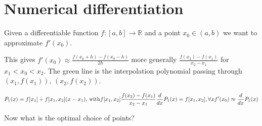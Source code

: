 \chapter{Numerical differentiation}

Given a differentiable function $f : [a, b] \rightarrow \mathbb{R}$ and a point
$x_0 \in (a, b)$ we want to approximate $f'(x_0)$.
  

This gives $f'(x_0) \approx \frac{f(x_0 + h) - f(x_0 - h)}{2h}$ more generally
$\frac{f(x_2) - f(x_1)}{x_2 - x_1}$ for $x_1 < x_0 < x_2$.
The green line is the interpolation polynomial passing through 
$(x_1, f(x_1))$, $(x_2, f(x_2))$.

\[
	P_1(x) = f[x_1] + f[x_1, x_2](x - x_1) \text{, with} f[x_1, x_2] 
	\frac{f(x_2) - f(x_1)}{x_2 - x_1} \\
	\frac{d}{dx} P_1(x) = f[x_1, x_2], \forall x \\
	f'(x_0) \approx \frac{d}{dx} P_1(x)
\]

Now what is the optimal choice of points?